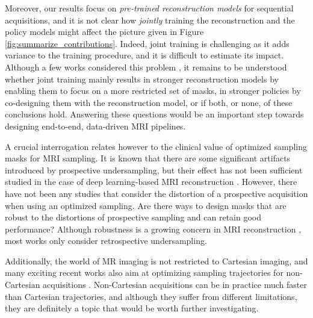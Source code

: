 Moreover, our results focus on \textit{pre-trained reconstruction models} for sequential acquisitions, and it is not clear how \textit{jointly} training the reconstruction and the policy models might affect the picture given in Figure \ref{fig:summarize_contributions}. Indeed, joint training is challenging as it adds variance to the training procedure, and it is difficult to estimate its impact.
Although a few works considered this problem \citep{jin2019self,van2021active,yin2021end}, it remains to be understood whether joint training mainly results in stronger reconstruction models by enabling them to focus on a more restricted set of masks, in stronger policies by co-designing them with the reconstruction model, or if both, or none, of these conclusions hold. Answering these questions would be an important step towards designing end-to-end, data-driven MRI pipelines. 



A crucial interrogation relates however to the clinical value of optimized sampling masks for MRI sampling. It is known  that there are some significant artifacts introduced by prospective undersampling, but their effect has not been sufficient studied in the case of deep learning-based MRI reconstruction \citep{yu2022validation}. However, there have not been any studies that consider the distortion of a prospective acquisition when using an optimized sampling. Are there ways to design masks that are robust to the distortions of prospective sampling and can retain good performance? Although robustness is a growing concern in MRI reconstruction \citep{antun2020instabilities,johnson2021evaluation,darestani2021measuring}, most works only consider retrospective undersampling.   

Additionally, the world of MR imaging is not restricted to Cartesian imaging, and many exciting recent works also aim at optimizing sampling trajectories for non-Cartesian acquisitions \citep{lazarus2019sparkling,weiss2019pilot,wang2021b,chaithya2022benchmarking}. Non-Cartesian acquisitions can be in practice much faster than Cartesian trajectories, and although they suffer from different limitations, they are definitely a topic that would be worth further investigating.

